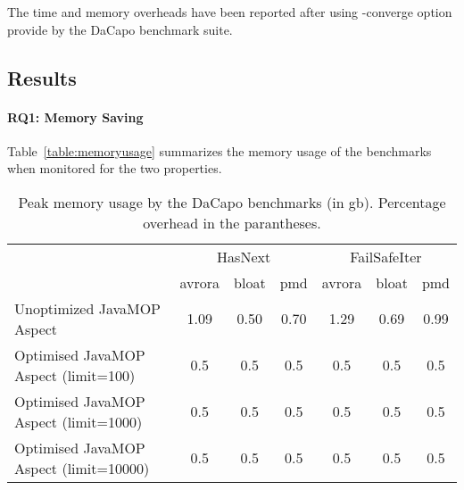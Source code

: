 The time and memory overheads have been reported after using -converge option 
provide by the DaCapo benchmark suite.

\subsection{Results}
\label{sec:results}

\paragraph{RQ1: Memory Saving}

Table~\ref{table:memoryusage} summarizes the memory usage of the benchmarks when 
monitored for the two properties.





\begin{table*}[!ht]
\centering
\begin{tabular}{|p{4cm}|c|c|c|c|c|c|}
\hline
  \multirow{2}{*}{}                                 & 
\multicolumn{3}{c|}{HasNext}           & \multicolumn{3}{c|}{FailSafeIter}       
      \\ \cline{2-7}                                              
                    & avrora           & bloat         & pmd      & avrora       
    & bloat         & pmd \\ \hline
Unoptimized JavaMOP Aspect     & 1.09 & 0.50 & 0.70  & 1.29 & 0.69 & 0.99 \\ 
\hline
Optimised JavaMOP Aspect (limit=100)   & 0.5  & 0.5  & 0.5   & 0.5  & 0.5  & 0.5 
  \\ \hline
Optimised JavaMOP Aspect (limit=1000)   & 0.5  & 0.5  & 0.5   & 0.5  & 0.5  & 
0.5   \\ \hline
Optimised JavaMOP Aspect (limit=10000)   & 0.5  & 0.5  & 0.5   & 0.5  & 0.5  & 
0.5   \\ \hline

\end{tabular}
\caption{Peak memory usage by the DaCapo benchmarks (in gb). Percentage overhead 
in the parantheses.}
\end{table*}
\label{table:memoryusage}


